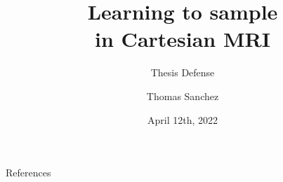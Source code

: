 \documentclass[9pt,aspectratio=169]{beamer}
\title{Learning to sample\\ in Cartesian MRI}
\subtitle{Thesis Defense}
\author{Thomas Sanchez}
\institute{Advised by Volkan Cevher}
\date{April 12th, 2022}
\begin{document}
    \begin{frame}
        \maketitle
    \end{frame}
    

    
    
    
    
           
    
    
    \appendix
    \begin{frame}[allowframebreaks]{References}
        \printbibliography
    \end{frame}

    
    
    
    
\end{document}
